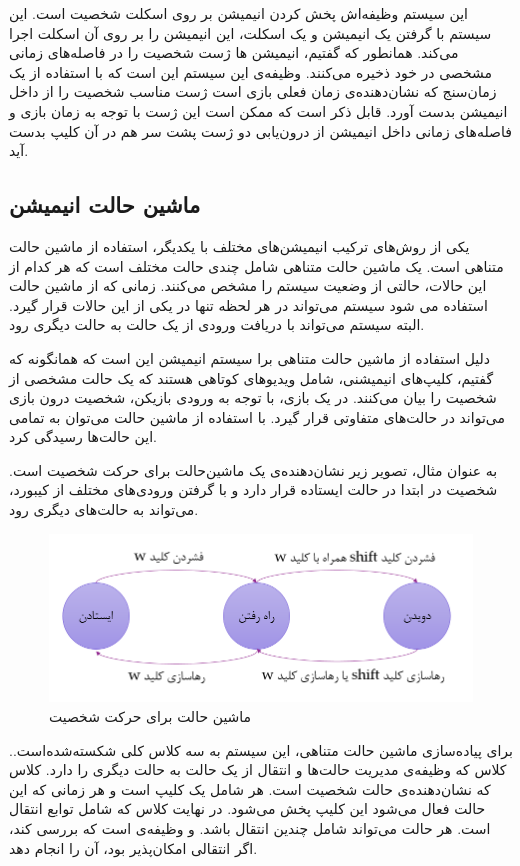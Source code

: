 این سیستم وظیفه‌اش پخش کردن انیمیشن بر روی اسکلت شخصیت است.
این سیستم با گرفتن یک انیمیشن و یک اسکلت، این انیمیشن را بر روی آن اسکلت اجرا می‌کند.
همانطور که گفتیم، انیمیشن ها ژست شخصیت را در فاصله‌های زمانی مشخصی در خود ذخیره ‌می‌کنند. وظیفه‌ی این سیستم این است که با استفاده از یک زمان‌سنج که نشان‌دهنده‌ی زمان فعلی بازی است ژست مناسب شخصیت را از داخل انیمیشن بدست آورد.
قابل ذکر است که ممکن است این ژست با توجه به زمان بازی و فاصله‌های زمانی داخل انیمیشن
از درون‌یابی دو ژست پشت سر هم در آن کلیپ بدست آید.

\subsection{ماشین حالت انیمیشن}

یکی از روش‌های ترکیب انیمیشن‌های مختلف با یکدیگر، استفاده از ماشین حالت متناهی است.
یک ماشین‌ حالت متناهی شامل چندی حالت مختلف است
که هر کدام از این حالات، حالتی از وضعیت سیستم را مشخص می‌کنند.
زمانی که از ماشین حالت استفاده می شود سیستم می‌تواند در هر لحظه تنها در یکی از این حالات قرار گیرد.
البته سیستم می‌تواند با دریافت ورودی از یک حالت به حالت دیگری رود.

دلیل استفاده از ماشین حالت متناهی برا سیستم انیمیشن این است که همانگونه که گفتیم، کلیپ‌های انیمیشنی، شامل ویدیو‌های کوتاهی هستند که یک حالت مشخصی از شخصیت را بیان می‌کنند.
در یک بازی، با توجه به ورودی بازیکن، شخصیت درون بازی می‌تواند در حالت‌های متفاوتی قرار گیرد. با استفاده از ماشین حالت می‌توان به تمامی این حالت‌ها رسیدگی کرد.

به عنوان مثال، تصویر زیر نشان‌دهنده‌ی یک ماشین‌حالت برای حرکت شخصیت است. شخصیت در ابتدا در حالت ایستاده قرار دارد و با گرفتن
ورودی‌های مختلف از کیبورد، می‌تواند به حالت‌های دیگری رود.

\begin{figure}[ht]
	\centerline{\includegraphics[width=\textwidth,height=\textheight,keepaspectratio]{Figures/Ch5/LocomotionStateMachine.png}}

	\caption{ماشین حالت برای حرکت شخصیت}
	\label{fig:LocomotionStateMachine}
\end{figure}


برای پیا‌ده‌سازی ماشین حالت متناهی، این سیستم به سه کلاس کلی شکسته‌شده‌است..
کلاس
که وظیفه‌ی مدیریت حالت‌ها و انتقال از یک حالت به حالت دیگری را دارد.
کلاس 
که نشان‌دهنده‌ی حالت شخصیت است. هر 
شامل یک کلیپ است و هر زمانی که این حالت فعال می‌شود این کلیپ پخش می‌شود.
 در نهایت کلاس
که شامل توابع انتقال است.
هر حالت می‌تواند شامل چندین انتقال باشد. و وظیفه‌ی
است که بررسی کند، اگر انتقالی امکان‌پذیر بود، آن را انجام دهد.


